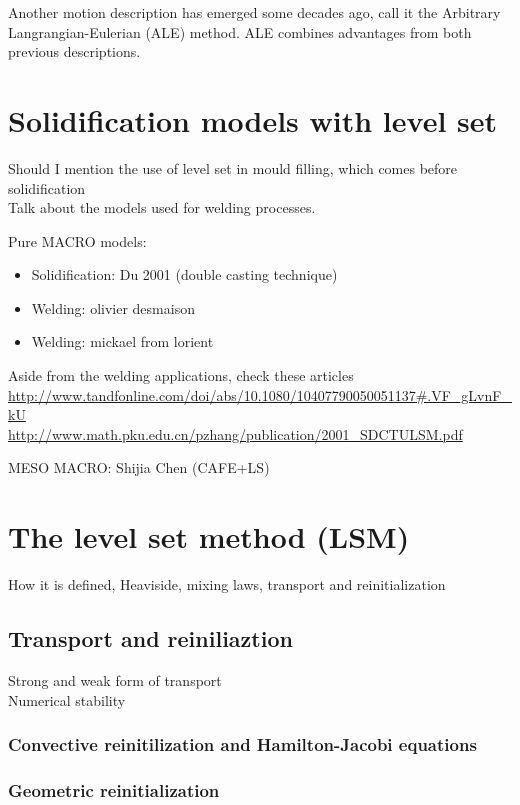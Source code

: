 Another motion description has emerged some decades ago, \citet{hirt_arbitrary_1971} call it the Arbitrary Langrangian-Eulerian (ALE) method. 
ALE combines advantages from both previous descriptions. 


\section{Solidification models with level set}
Should I mention the use of level set in mould filling, which comes before solidification \\
Talk about the models used for welding processes. 

Pure MACRO models:
\begin{itemize}
\item Solidification: Du 2001 (double casting technique)
\item Welding: olivier desmaison
\item Welding: mickael from lorient 
\end{itemize}
Aside from the welding applications, check these articles
\url{http://www.tandfonline.com/doi/abs/10.1080/10407790050051137#.VF_gLvnF_kU} \\
\url{http://www.math.pku.edu.cn/pzhang/publication/2001_SDCTULSM.pdf}

MESO MACRO: Shijia Chen (CAFE+LS)

\section{The level set method (LSM)}
How it is defined, Heaviside, mixing laws, transport and reinitialization

\subsection{Transport and reiniliaztion}
Strong and weak form of transport \\
Numerical stability \\
\subsubsection{Convective reinitilization and Hamilton-Jacobi equations}
\subsubsection{Geometric reinitialization}


